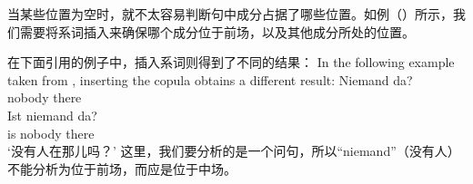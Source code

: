 当某些位置为空时，就不太容易判断句中成分占据了哪些位置。如例（）所示，我们需要将系词插入来确保哪个成分位于前场，以及其他成分所处的位置。

在下面\citet[]{Paul1919a}引用的例子中，插入系词则得到了不同的结果：
In the following example taken from \citet[]{Paul1919a}, inserting the copula obtains a different result: 
\eal
\ex 
\gll Niemand da?\\
	 nobody there\\
\ex 
\gll Ist niemand da?\\
	 is nobody there\\
\glt `没有人在那儿吗？'
\zl
这里，我们要分析的是一个问句，所以“niemand”（没有人）不能分析为位于前场，而应是位于中场。

